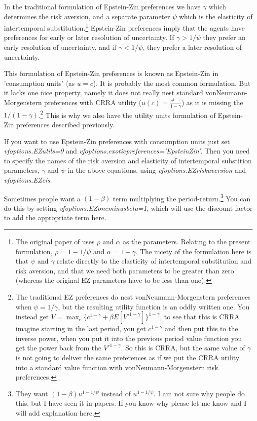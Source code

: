 In the traditional formulation of Epstein-Zin preferences we have $\gamma$ which determines the risk aversion, and a separate parameter $\psi$ which is the elasticity of intertemporal substitution.\footnote{The original paper of \cite*{EpsteinZin1989} uses $\rho$ and $\alpha$ as the parameters. Relating to the present formulation, $\rho=1-1/\psi$ and $\alpha=1-\gamma$. The nicety of the formulation here is that $\psi$ and $\gamma$ relate directly to the elasticity of intertemporal substitution and risk aversion, and that we need both parameters to be greater than zero (whereas the original EZ parameters have to be less than one).} Epstein-Zin preferences imply that the agents have preferences for early or later resolution of uncertainty. If $\gamma>1/\psi$ they prefer an early resolution of uncertainty, and if $\gamma<1/\psi$, they prefer a later resolution of uncertainty.

This formulation of Epstein-Zin preferences is known as Epstein-Zin in 'consumption units' (as $u=c$). It is probably the most common formulation. But it lacks one nice property, namely it does not really nest standard vonNeumann-Morgenstern preferences with CRRA utility ($u(c)=\frac{c^{1-\gamma}}{1-\gamma}$) as it is missing the $1/(1-\gamma)$.\footnote{The traditional EZ preferences do nest vonNeumann-Morgenstern preferences when $\psi=1/\gamma$, but the resulting utility function is an oddly written one. You instead get $V=\max_{c} \{ c^{1-\gamma} + \beta E[V'^{1-\gamma}]\}^{1-\gamma}$, to see that this is CRRA imagine starting in the last period, you get $c^{1-\gamma}$ and then put this to the inverse power, when you put it into the previous period value function you get the power back from the $V'^{1-\gamma}$. So this is CRRA, but the same value of $\gamma$ is not going to deliver the same preferences as if we put the CRRA utility into a standard value function with vonNeumann-Morgenstern risk preferences.} This is why we also have the utility units formulation of Epstein-Zin preferences described previously.

If you want to use Epstein-Zin preferences with consumption units just set \textit{vfoptions.EZutils=0} and \textit{vfoptions.exoticpreferences='EpsteinZin'}. Then you need to specify the names of the risk aversion and elasticity of intertemporal substition parameters, $\gamma$ and $\psi$ in the above equations, using  \textit{vfoptions.EZriskaversion} and  \textit{vfoptions.EZeis}.

Sometimes people want a $(1-\beta)$ term multiplying the period-return.\footnote{They want $(1-\beta) u^{1-1/\psi}$ instead of $u^{1-1/\psi}$. I am not sure why people do this, but I have seen it in papers. If you know why please let me know and I will add explanation here.} You can do this by setting \textit{vfoptions.EZoneminusbeta=1}, which will use the discount factor to add the appropriate term here.



